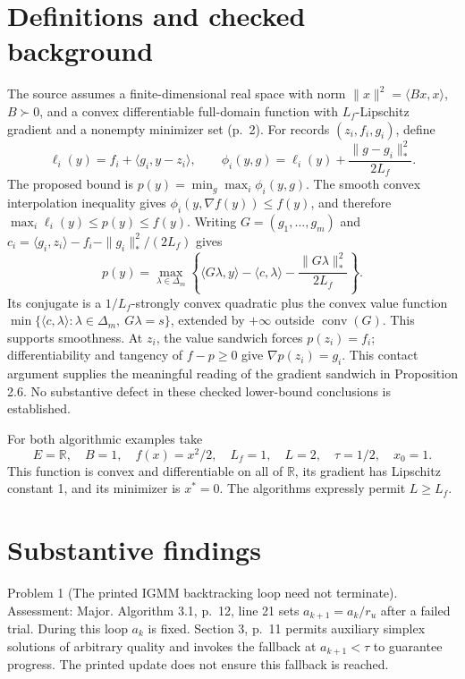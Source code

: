 \documentclass[10pt]{article}
\begin{document}
\section*{Definitions and checked background}
The source assumes a finite-dimensional real space with norm \(\|x\|^2=\langle Bx,x\rangle\), \(B\succ0\), and a convex differentiable full-domain function with \(L_f\)-Lipschitz gradient and a nonempty minimizer set (p. 2). For records \((z_i,f_i,g_i)\), define \[\ell_i(y)=f_i+\langle g_i,y-z_i\rangle,\qquad
 \phi_i(y,g)=\ell_i(y)+\frac{\|g-g_i\|_*^2}{2L_f}.\] The proposed bound is \(p(y)=\min_g\max_i\phi_i(y,g)\). The smooth convex interpolation inequality gives \(\phi_i(y,\nabla f(y))\le f(y)\), and therefore \(\max_i\ell_i(y)\le p(y)\le f(y)\). Writing \(G=(g_1,\ldots,g_m)\) and \(c_i=\langle g_i,z_i\rangle-f_i-\|g_i\|_*^2/(2L_f)\) gives \[p(y)=\max_{\lambda\in\Delta_m}
 \left\{\langle G\lambda,y\rangle-\langle c,\lambda\rangle
              -\frac{\|G\lambda\|_*^2}{2L_f}\right\}.\] Its conjugate is a \(1/L_f\)-strongly convex quadratic plus the convex value function \(\min\{\langle c,\lambda\rangle:\lambda\in\Delta_m,\ G\lambda=s\}\), extended by \(+\infty\) outside \(\operatorname{conv}(G)\). This supports smoothness. At \(z_i\), the value sandwich forces \(p(z_i)=f_i\); differentiability and tangency of \(f-p\ge0\) give \(\nabla p(z_i)=g_i\). This contact argument supplies the meaningful reading of the gradient sandwich in Proposition 2.6. No substantive defect in these checked lower-bound conclusions is established.\par
For both algorithmic examples take \[E=\mathbb R,\quad B=1,\quad f(x)=x^2/2,\quad L_f=1,\quad
 L=2,\quad \tau=1/2,\quad x_0=1.\] This function is convex and differentiable on all of \(\mathbb R\), its gradient has Lipschitz constant 1, and its minimizer is \(x^*=0\). The algorithms expressly permit \(L\ge L_f\).\par
\section*{Substantive findings}
Problem 1 (The printed IGMM backtracking loop need not terminate).  Assessment: Major. Algorithm 3.1, p. 12, line 21 sets \(a_{k+1}=a_k/r_u\) after a failed trial. During this loop \(a_k\) is fixed. Section 3, p. 11 permits auxiliary simplex solutions of arbitrary quality and invokes the fallback at \(a_{k+1}<\tau\) to guarantee progress. The printed update does not ensure this fallback is reached.\par
\end{document}
